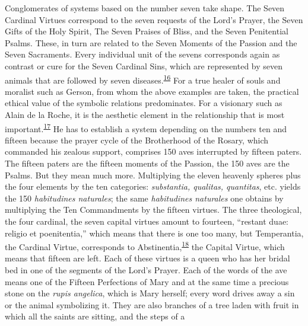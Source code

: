\protect\hypertarget{16_Chapter_Nine__THE_DECLINE_OF_SYM.xhtmlux5cux23page_241}{}{}Conglomerates
of systems based on the number seven take shape. The Seven Cardinal
Virtues correspond to the seven requests of the Lord's Prayer, the Seven
Gifts of the Holy Spirit, The Seven Praises of Bliss, and the Seven
Penitential Psalms. These, in turn are related to the Seven Moments of
the Passion and the Seven Sacraments. Every individual unit of the
sevens corresponds again as contrast or cure for the Seven Cardinal
Sins, which are represented by seven animals that are followed by seven
diseases.\textsuperscript{\protect\hypertarget{16_Chapter_Nine__THE_DECLINE_OF_SYM.xhtmlux5cux23id_761}{\protect\hyperlink{23_NOTES.xhtmlux5cux23id_762}{16}}}
For a true healer of souls and moralist such as Gerson, from whom the
above examples are taken, the practical ethical value of the symbolic
relations predominates. For a visionary such as Alain de la Roche, it is
the aesthetic element in the relationship that is most
important.\textsuperscript{\protect\hypertarget{16_Chapter_Nine__THE_DECLINE_OF_SYM.xhtmlux5cux23id_759}{\protect\hyperlink{23_NOTES.xhtmlux5cux23id_760}{17}}}
He has to establish a system depending on the numbers ten and fifteen
because the prayer cycle of the Brotherhood of the Rosary, which
commanded his zealous support, comprises 150 aves interrupted by fifteen
paters. The fifteen paters are the fifteen moments of the Passion, the
150 aves are the Psalms. But they mean much more. Multiplying the eleven
heavenly spheres plus the four elements by the ten categories:
\emph{substantia, qualitas, quantitas}, etc. yields the 150
\emph{habitudines naturales}; the same \emph{habitudines naturales} one
obtains by multiplying the Ten Commandments by the fifteen virtues. The
three theological, the four cardinal, the seven capital virtues amount
to fourteen, ``restant duae: religio et poenitentia,'' which means that
there is one too many, but Temperantia, the Cardinal Virtue, corresponds
to
Abstinentia,\textsuperscript{\protect\hypertarget{16_Chapter_Nine__THE_DECLINE_OF_SYM.xhtmlux5cux23id_757}{\protect\hyperlink{23_NOTES.xhtmlux5cux23id_758}{18}}}
the Capital Virtue, which means that fifteen are left. Each of these
virtues is a queen who has her bridal bed in one of the segments of the
Lord's Prayer. Each of the words of the ave means one of the Fifteen
Perfections of Mary and at the same time a precious stone on the
\emph{rupis angelica}, which is Mary herself; every word drives away a
sin or the animal symbolizing it. They are also branches of a tree laden
with fruit in which all the saints are sitting, and the steps of a
